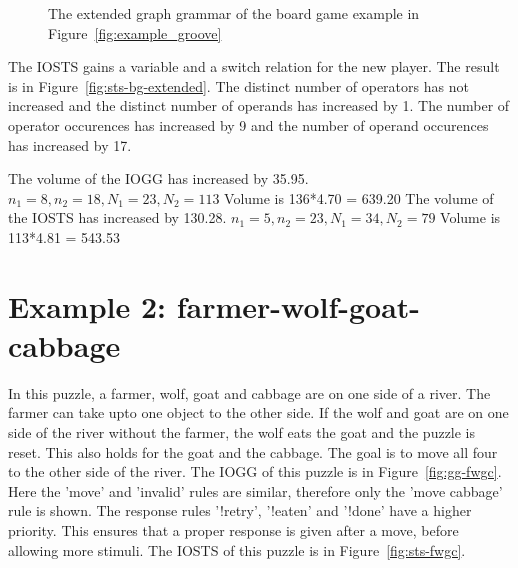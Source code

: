 \begin{figure}[ht]
  \begin{center}
    \hspace{20px}
  \end{center}
  \caption{The extended graph grammar of the board game example in Figure~\ref{fig:example_groove}}
  \label{fig:gg-bg-extended}
\end{figure}

The IOSTS gains a variable and a switch relation for the new player. The result is in Figure~\ref{fig:sts-bg-extended}. The distinct number of operators has not increased and the distinct number of operands has increased by 1. The number of operator occurences has increased by 9 and the number of operand occurences has increased by 17.

The volume of the IOGG has increased by 35.95. $n_1 = 8, n_2 = 18, N_1 = 23, N_2 = 113$ Volume is 136*4.70 = 639.20
The volume of the IOSTS has increased by 130.28. $n_1 = 5, n_2 = 23, N_1 = 34, N_2 = 79$ Volume is 113*4.81 = 543.53


\section{Example 2: farmer-wolf-goat-cabbage}
In this puzzle, a farmer, wolf, goat and cabbage are on one side of a river. The farmer can take upto one object to the other side. If the wolf and goat are on one side of the river without the farmer, the wolf eats the goat and the puzzle is reset. This also holds for the goat and the cabbage. The goal is to move all four to the other side of the river. The IOGG of this puzzle is in Figure~\ref{fig:gg-fwgc}. Here the 'move' and 'invalid' rules are similar, therefore only the 'move cabbage' rule is shown. The response rules '!retry', '!eaten' and '!done' have a higher priority. This ensures that a proper response is given after a move, before allowing more stimuli. The IOSTS of this puzzle is in Figure~\ref{fig:sts-fwgc}.

